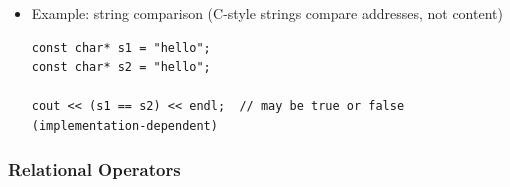 \documentclass[10pt]{article}
\begin{document}
\begin{itemize}
\begin{verbatim}
int* p1 = &a;
int* p2 = &b;

cout << (p1 == p2) << endl;  // false (different memory locations)
cout << (a == b) << endl;    // true (values are equal)
	\end{verbatim}

	\item Example: string comparison (C-style strings compare addresses, not content)
	\begin{verbatim}
const char* s1 = "hello";
const char* s2 = "hello";

cout << (s1 == s2) << endl;  // may be true or false (implementation-dependent)
	\end{verbatim}
\end{itemize}

\newpage

\subsubsection{Relational Operators}
\end{document}
